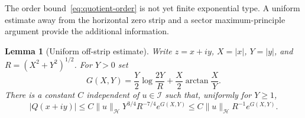 \documentclass[11pt,a4paper]{article}
\numberwithin{equation}{section}
\newtheorem{lemma}[theorem]{Lemma}
\theoremstyle{definition}
\theoremstyle{remark}
\newcommand{\Hh}{\mathcal H}
\newcommand{\Ii}{\mathcal I}
\newcommand{\norm}[1]{\lVert #1\rVert}
\begin{document}
The order bound~\eqref{eq:quotient-order} is not yet finite exponential type. A uniform estimate away from the horizontal zero strip and a sector maximum-principle argument provide the additional information.

\begin{lemma}[Uniform off-strip estimate]\label{lem:offstrip}
Write $z=x+iy$, $X=|x|$, $Y=|y|$, and $R=(X^2+Y^2)^{1/2}$. For $Y>0$ set
\begin{equation}\label{eq:G-function}
 G(X,Y)=\frac Y2\log\frac{2Y}{R}+\frac X2\arctan\frac XY.
\end{equation}
There is a constant $C$ independent of $u\in\Ii$ such that, uniformly for $Y\ge1$,
\begin{equation}\label{eq:offstrip}
 |Q(x+iy)|\le C\norm{u}_{\Hh}Y^{3/4}R^{-7/4}e^{G(X,Y)}
 \le C\norm{u}_{\Hh}R^{-1}e^{G(X,Y)}.
\end{equation}
\end{lemma}
\end{document}
